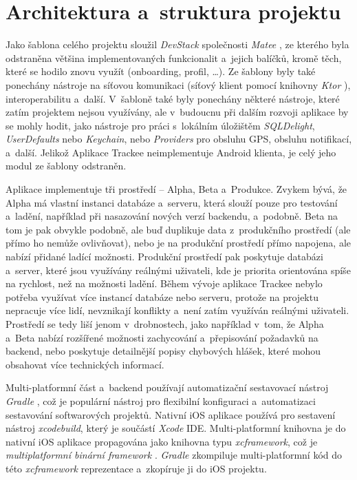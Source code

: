 \section{Architektura a~struktura projektu}\label{project-structure}

Jako šablona celého projektu sloužil \emph{DevStack} společnosti \emph{Matee} \cite{matee-devstack}, ze kterého byla odstraněna většina implementovaných funkcionalit a~jejich balíčků, kromě těch, které se hodilo znovu využít (onboarding, profil, \dots). Ze šablony byly také ponechány nástroje na síťovou komunikaci (síťový klient pomocí knihovny \emph{Ktor} \cite{ktor}), interoperabilitu a~další. V~šabloně také byly ponechány některé nástroje, které zatím projektem nejsou využívány, ale v~budoucnu při dalším rozvoji aplikace by se mohly hodit, jako nástroje pro práci s~lokálním úložištěm \emph{SQLDelight}, \emph{UserDefaults} nebo \emph{Keychain}, nebo \emph{Providers} pro obsluhu GPS, obsluhu notifikací, a~další. Jelikož Aplikace Trackee neimplementuje Android klienta, je celý jeho modul ze šablony odstraněn.

Aplikace implementuje tři prostředí – Alpha, Beta a~Produkce. Zvykem bývá, že Alpha má vlastní instanci databáze a~serveru, která slouží pouze pro testování a~ladění, například při nasazování nových verzí backendu, a~podobně. Beta na tom je pak obvykle podobně, ale buď duplikuje data z~produkčního prostředí (ale přímo ho nemůže ovlivňovat), nebo je na produkční prostředí přímo napojena, ale nabízí přidané ladící možnosti. Produkční prostředí pak poskytuje databázi a~server, které jsou využívány reálnými uživateli, kde je priorita orientována spíše na rychlost, než na možnosti ladění. Během vývoje aplikace Trackee nebylo potřeba využívat více instancí databáze nebo serveru, protože na projektu nepracuje více lidí, nevznikají konflikty a~není zatím využíván reálnými uživateli. Prostředí se tedy liší jenom v~drobnostech, jako například v~tom, že Alpha a~Beta nabízí rozšířené možnosti zachycování a~přepisování požadavků na backend, nebo poskytuje detailnější popisy chybových hlášek, které mohou obsahovat více technických informací. 

Multi-platformní část a~backend používají automatizační sestavovací nástroj \emph{Gradle} \cite{gradle}, což je populární nástroj pro flexibilní konfiguraci a~automatizaci sestavování softwarových projektů. Nativní iOS aplikace používá pro sestavení nástroj \emph{xcodebuild}, který je součástí \emph{Xcode} IDE. Multi-platformní knihovna je do nativní iOS aplikace propagována jako knihovna typu \emph{xcframework}, což je \emph{multiplatformní binární framework} \cite{xcframework}. \emph{Gradle} zkompiluje multi-platformní kód do této \emph{xcframework} reprezentace a~zkopíruje ji do iOS projektu.

